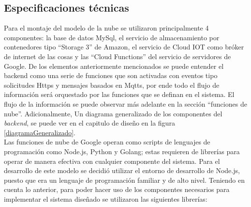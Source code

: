 \subsection{Especificaciones técnicas}

Para el montaje del modelo de la nube se utilizaron principalmente 4 componentes: la base de datos MySql, el servicio de almacenamiento por contenedores tipo ``Storage 3'' de Amazon, el servicio de Cloud IOT como bróker de internet de las cosas y las ``Cloud Functions'' del servicio de servidores de Google. De los elementos anteriormente mencionados se puede entender el backend como una serie de funciones que son activadas con eventos tipo solicitudes Https y mensajes basados en Mqtts, por ende todo el flujo de información será orquestado por las funciones que se definan en el sistema. El flujo de la información se puede observar más adelante en la sección ``funciones de nube''. Adicionalmente, Un diagrama generalizado de los componentes del \textit{backend}, se puede ver en el capitulo de diseño en la figura \ref{diagramaGeneralizado}. 
\vspace{0.5cm}\\
Las funciones de nube de Google operan como scripts de lenguajes de programación como Node.js, Python y Golang; estas requieren de librerías para operar de manera efectiva con cualquier componente del sistema. Para el desarrollo de este modelo se decidió utilizar el entorno de desarrollo de Node.js, puesto que era un lenguaje de programación familiar y de alto nivel. Teniendo en cuenta lo anterior, para poder hacer uso de los componentes necesarios para implementar el sistema diseñado se utilizaron las siguientes librerías:

